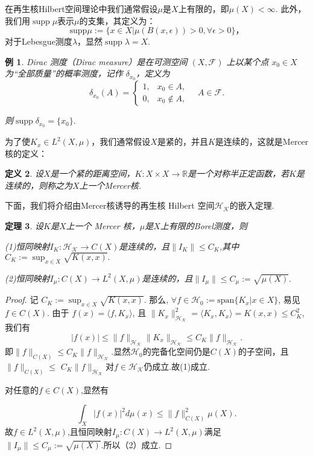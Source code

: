 \documentclass[12pt, a4paper, oneside]{ctexbook}
\newtheorem{theorem}{定理}[section]
\newtheorem{definition}[theorem]{定义}
\newtheorem{example}[theorem]{例}
\begin{document}
在再生核Hilbert空间理论中我们通常假设$\mu$是$X$上有限的，即$\mu(X)<\infty$. 此外，我们用$\operatorname{supp} \mu$表示$\mu$的支集，其定义为：
\begin{equation*}
    \mathrm{supp}\mu:=\{x\in X|\mu(B(x,\epsilon))>0,\forall\epsilon>0\}，
\end{equation*}
对于Lebesgue测度$\lambda$，显然$\operatorname{supp}\lambda=X$.
\begin{example}
    Dirac 测度（Dirac measure）是在可测空间 $(X, \mathcal{F})$ 上以某个点 $x_0 \in X$ 为“全部质量”的概率测度，记作 $\delta_{x_0}$，定义为
$$\delta_{x_0}(A) = \begin{cases}
1, & x_0 \in A, \\
0, & x_0 \notin A,
\end{cases} \quad A \in \mathcal{F}.$$

则$\operatorname{supp}\delta_{x_0}=\{x_0\}.$
\end{example}

为了使$K_x\in L^2(X,\mu)$，我们通常假设$X$是紧的，并且$K$是连续的，这就是Mercer核的定义：
\begin{definition}
    设$X$是一个紧的距离空间，$K:X\times X\to\mathbb{R}$是一个对称半正定函数，若$K$是连续的，则称之为$X$上一个Mercer核.
\end{definition}


下面，我们将介绍由Mercer核诱导的再生核 Hilbert 空间$\mathcal{H_K}$的嵌入定理.
\begin{theorem}
    设$K$是$X$上一个 Mercer 核，$\mu$是$X$上有限的Borel测度，则
    
(1)恒同映射$I_K:\mathcal{H_K}\to C(X)$是连续的，且$\|I_K\|\leq C_K$,其中$C_K:=\sup_{x\in X}\sqrt{K(x,x)}.$

(2)恒同映射$I_\mu:C(X)\to L^2(X,\mu)$是连续的，且$\|I_\mu\|\leq C_\mu:=\sqrt{\mu(X)}.$
\end{theorem}

\begin{proof}
    记 $C_K := \sup_{x \in X} \sqrt{K(x, x)}$. 那么, $\forall f \in \mathcal{H}_0 := \text{span}\{K_x | x \in X\}$, 易见 $f \in C(X)$. 由于 $f(x) = \langle f, K_x  \rangle$, 且 $\|K_x\|_{\mathcal{H_K}}^2 = \langle K_x, K_x \rangle = K(x, x) \leq C_K^2$, 我们有
$$|f(x)| \leq \|f\|_{\mathcal{H_K}} \|K_x\|_{\mathcal{H_K}} \leq C_K \|f\|_{\mathcal{H_K}}.$$
即$\|f\|_{C(X)}\leq C_K\|f\|_{\mathcal{H_K}}$.显然$\mathcal{H}_0$的完备化空间仍是$C(X)$的子空间，且$\|f\|_{C(X)}\leq$
$C_{K}\|f\|_{\mathcal{H_K}}$对$f\in\mathcal{H_K}$仍成立.故(1)成立.

对任意的$f\in C(X)$,显然有

$$\int_X|f(x)|^2d\mu(x)\leq\|f\|_{C(X)}^2\mu(X).$$
故$f\in L^2(X,\mu)$,且恒同映射$I_\mu:C(X)\to L^2(X,\mu)$满足$\|I_\mu\|\leq C_\mu:=\sqrt{\mu(X)}$.所以（2）成立.
\end{proof}
\end{document}
